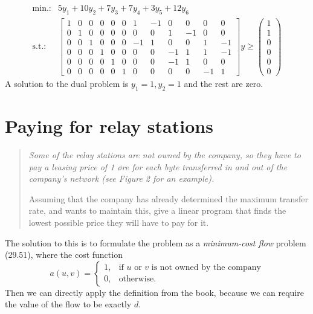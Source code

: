 \documentclass{article}
\begin{document}
\[
\begin{array}{cl}
\textrm{min.:} & 5y_1 + 10y_2 + 7y_3 + 7y_4 + 3y_5 + 12y_6\\
\textrm{s.t.:} &
 \begin{bmatrix}%
 1 & 0 & 0 & 0 & 0 & 0 & 1 & -1 & 0 & 0 & 0 & 0\\
 0 & 1 & 0 & 0 & 0 & 0 & 0 & 0 & 1 & -1 & 0 & 0\\
 0 & 0 & 1 & 0 & 0 & 0 & -1 & 1 & 0 & 0 & 1 & -1\\
 0 & 0 & 0 & 1 & 0 & 0 & 0 & 0 & -1 & 1 & 1 & -1\\
 0 & 0 & 0 & 0 & 1 & 0 & 0 & 0 & -1 & 1 & 0 & 0\\
 0 & 0 & 0 & 0 & 0 & 1 & 0 & 0 & 0 & 0 & -1 & 1
\end{bmatrix}y
\geq
\begin{pmatrix}
  1\\ 1\\ 0\\ 0\\ 0\\ 0
\end{pmatrix}
\end{array}
\]
A solution to the dual problem is $y_1 = 1, y_2 = 1$ and the rest are
zero.

\section*{Paying for relay stations}
\begin{quotation}\itshape
Some of the relay stations are not owned by the company, so they have
to pay a leasing price of 1 øre for each byte transferred in and out
of the company’s network (see Figure 2 for an example).  

Assuming that the company has already determined the maximum transfer
rate, and wants to maintain this, give a linear program that finds the
lowest possible price they will have to pay for it.
\end{quotation}
The solution to this is to formulate the problem as a
\emph{minimum-cost flow} problem (29.51), where the cost function
\[
a(u,v) = \left\{\begin{array}{ll}1,&\text{if $u$ or $v$ is not owned
  by the company}\\ 0,&\text{otherwise.}\end{array}\right.
\]
Then we can directly apply the definition from the book, because we
can require the value of the flow to be exactly $d$.
\end{document}
